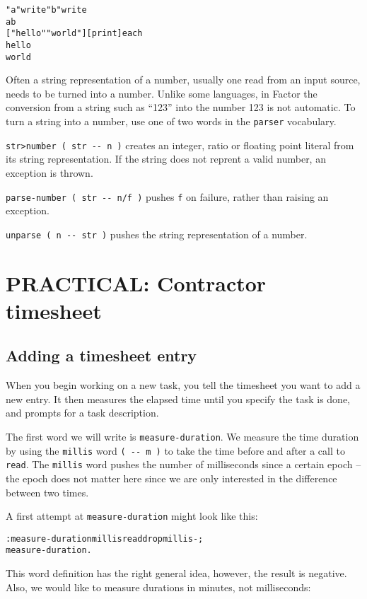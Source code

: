 \documentclass[english]{article}
\begin{document}
\begin{alltt}
"a" write "b" write
ab
{[} "hello" "world" {]} {[} print {]} each
hello
world
\end{alltt}
Often a string representation of a number, usually one read from an
input source, needs to be turned into a number. Unlike some languages,
in Factor the conversion from a string such as {}``123'' into the
number 123 is not automatic. To turn a string into a number, use one
of two words in the \texttt{parser} vocabulary.

\texttt{str>number ( str -{}- n )} creates an integer, ratio or floating
point literal from its string representation. If the string does not
reprent a valid number, an exception is thrown.

\texttt{parse-number ( str -{}- n/f )} pushes \texttt{f} on failure, rather
than raising an exception.

\texttt{unparse ( n -{}- str )} pushes the string representation of
a number.


\section{PRACTICAL: Contractor timesheet}


\subsection{Adding a timesheet entry}

When you begin working on a new task, you tell the timesheet you want
to add a new entry. It then measures the elapsed time until you specify
the task is done, and prompts for a task description.

The first word we will write is \texttt{measure-duration}. We measure
the time duration by using the \texttt{millis} word \texttt{( -{}-
m )} to take the time before and after a call to \texttt{read}. The
\texttt{millis} word pushes the number of milliseconds since a certain
epoch -- the epoch does not matter here since we are only interested
in the difference between two times.

A first attempt at \texttt{measure-duration} might look like this:

\begin{alltt}
: measure-duration millis read drop millis - ;
measure-duration .
\end{alltt}
This word definition has the right general idea, however, the result
is negative. Also, we would like to measure durations in minutes,
not milliseconds:
\end{document}
